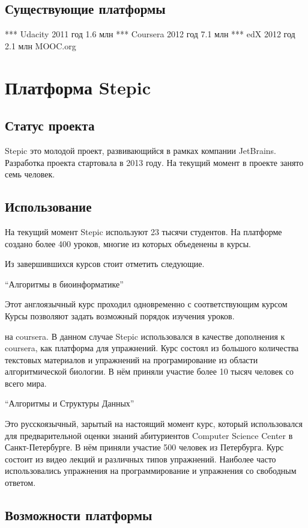 \documentclass{matmex-diploma-custom}
\begin{document}
\subsection*{Существующие платформы}

*** Udacity
   2011 год
   1.6 млн
*** Coursera
   2012 год
   7.1 млн
*** edX
   2012 год
   2.1 млн
   MOOC.org

\section{Платформа Stepic}

\subsection{Статус проекта}
Stepic это молодой проект, развивающийся в рамках компании
JetBrains. Разработка проекта стартовала в 2013 году. На текущий
момент в проекте занято семь человек.

\subsection{Использование}
На текущий момент Stepic используют 23 тысячи студентов. На платформе
создано более 400 уроков, многие из которых объеденены в курсы.

Из завершившихся курсов стоит отметить следующие.

``Алгоритмы в биоинформатике''

Этот англоязычный курс проходил одновременно с соответствующим курсом Курсы позволяют задать возможный
порядок изучения уроков.

на coursera. В данном случае Stepic использовался в качестве
дополнения к coursera, как платформа для упражнений. Курс состоял из
большого количества текстовых материалов и упражнений на
програмирование из области алгоритмической биологии. В нём приняли
участие более 10 тысяч человек со всего мира.

``Алгоритмы и Структуры Данных''

Это русскоязычный, зарытый на настоящий момент курс, который
использовался для предварительной оценки знаний абитуриентов Computer
Science Center в Санкт-Петербурге. В нём приняли участие 500 человек
из Петербурга. Курс состоит из видео лекций и различных типов
упражнений. Наиболее часто использовались упражнения на
программирование и упражнения со свободным ответом.

\subsection{Возможности платформы}
\end{document}
